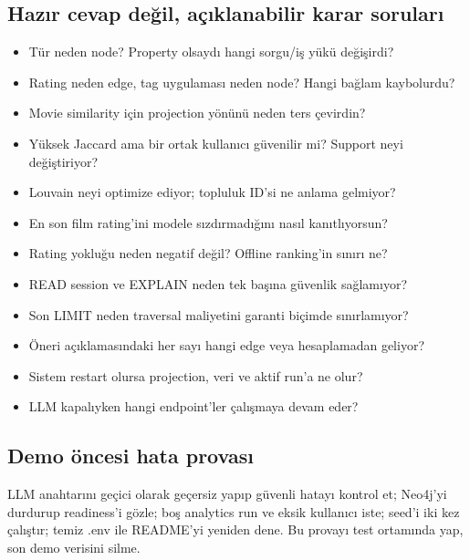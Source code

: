 \documentclass[11pt,a4paper]{article}
\begin{document}
\subsection{Hazır cevap değil, açıklanabilir karar soruları}
\begin{itemize}
\item Tür neden node? Property olsaydı hangi sorgu/iş yükü değişirdi?
\item Rating neden edge, tag uygulaması neden node? Hangi bağlam kaybolurdu?
\item Movie similarity için projection yönünü neden ters çevirdin?
\item Yüksek Jaccard ama bir ortak kullanıcı güvenilir mi? Support neyi değiştiriyor?
\item Louvain neyi optimize ediyor; topluluk ID'si ne anlama gelmiyor?
\item En son film rating'ini modele sızdırmadığını nasıl kanıtlıyorsun?
\item Rating yokluğu neden negatif değil? Offline ranking'in sınırı ne?
\item READ session ve EXPLAIN neden tek başına güvenlik sağlamıyor?
\item Son LIMIT neden traversal maliyetini garanti biçimde sınırlamıyor?
\item Öneri açıklamasındaki her sayı hangi edge veya hesaplamadan geliyor?
\item Sistem restart olursa projection, veri ve aktif run'a ne olur?
\item LLM kapalıyken hangi endpoint'ler çalışmaya devam eder?
\end{itemize}

\subsection{Demo öncesi hata provası}
LLM anahtarını geçici olarak geçersiz yapıp güvenli hatayı kontrol et; Neo4j'yi durdurup readiness'i gözle; boş analytics run ve eksik kullanıcı iste; seed'i iki kez çalıştır; temiz .env ile README'yi yeniden dene. Bu provayı test ortamında yap, son demo verisini silme.
\end{document}
